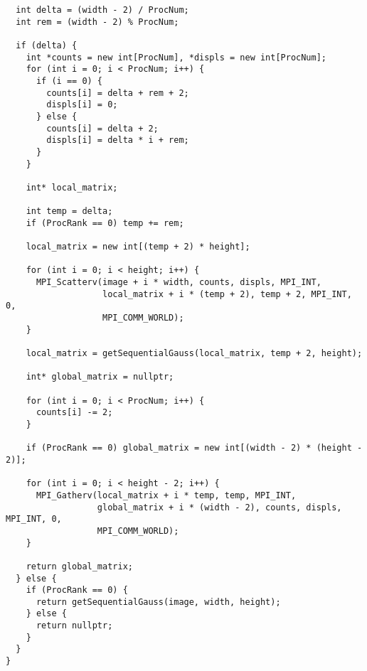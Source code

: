\documentclass{report}
\begin{document}
\begin{lstlisting}
  int delta = (width - 2) / ProcNum;
  int rem = (width - 2) % ProcNum;

  if (delta) {
    int *counts = new int[ProcNum], *displs = new int[ProcNum];
    for (int i = 0; i < ProcNum; i++) {
      if (i == 0) {
        counts[i] = delta + rem + 2;
        displs[i] = 0;
      } else {
        counts[i] = delta + 2;
        displs[i] = delta * i + rem;
      }
    }

    int* local_matrix;

    int temp = delta;
    if (ProcRank == 0) temp += rem;

    local_matrix = new int[(temp + 2) * height];

    for (int i = 0; i < height; i++) {
      MPI_Scatterv(image + i * width, counts, displs, MPI_INT,
                   local_matrix + i * (temp + 2), temp + 2, MPI_INT, 0,
                   MPI_COMM_WORLD);
    }

    local_matrix = getSequentialGauss(local_matrix, temp + 2, height);

    int* global_matrix = nullptr;

    for (int i = 0; i < ProcNum; i++) {
      counts[i] -= 2;
    }

    if (ProcRank == 0) global_matrix = new int[(width - 2) * (height - 2)];

    for (int i = 0; i < height - 2; i++) {
      MPI_Gatherv(local_matrix + i * temp, temp, MPI_INT,
                  global_matrix + i * (width - 2), counts, displs, MPI_INT, 0,
                  MPI_COMM_WORLD);
    }

    return global_matrix;
  } else {
    if (ProcRank == 0) {
      return getSequentialGauss(image, width, height);
    } else {
      return nullptr;
    }
  }
}
\end{lstlisting}
\end{document}
